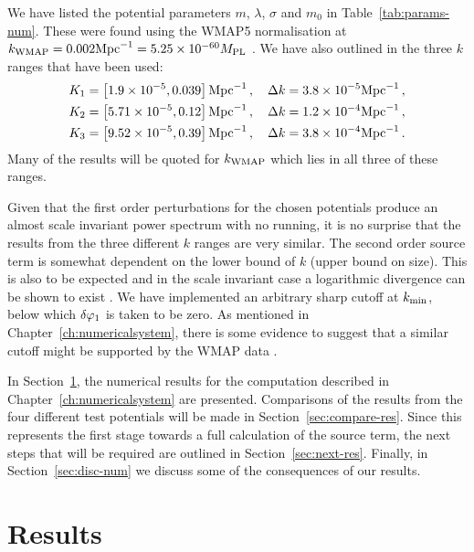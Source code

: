 We have listed the potential parameters $m$, $\lambda$, $\sigma$ and $m_0$
in Table~\ref{tab:params-num}. These were found using the WMAP5 normalisation
at $k_\mathrm{WMAP}=0.002 \mathrm{Mpc}^{-1} = 5.25 \times 10^{-60}M_{\mathrm{PL}}$ \cite{Komatsu:2008hk}.
We have also outlined in  the three $k$ ranges that have been
used:
% 
\begin{align}
\label{eq:Kranges-res}
K_1 &= \left[1.9\times 10^{-5}, 0.039\right]\mathrm{Mpc}^{-1}\,,\quad \Delta k =
3.8\times 10^{-5}\mathrm{Mpc}^{-1} \,,\nonumber\\
K_2 &= \left[5.71\times 10^{-5}, 0.12\right]\mathrm{Mpc}^{-1}\,, \quad \Delta k =
1.2\times 10^{-4}\mathrm{Mpc}^{-1} \,,
\nonumber\\ 
K_3 &= \left[9.52\times 10^{-5}, 0.39\right]\mathrm{Mpc}^{-1}\,, \quad \Delta k =
3.8\times 10^{-4}\mathrm{Mpc}^{-1} \,.
\end{align}
Many of the results will be quoted for $k_\mathrm{WMAP}$ which lies in all three of these
ranges.

Given that the first order perturbations for the chosen potentials produce an
almost scale invariant power spectrum with no running, it is no surprise that
the results from the three different $k$ ranges are very similar. The second
order source term is somewhat dependent on the lower bound of $k$ (upper bound
on size). This is also to be expected and in the scale invariant case a logarithmic
divergence can
be shown to exist \cite{Lyth:2007jh}. We have implemented an arbitrary sharp
cutoff at $k_{\mathrm{min}}$, below which 
$\delta\varphi_{1}$ is taken to be zero. 
As mentioned in Chapter~\ref{ch:numericalsystem}, there is some evidence to suggest
that a similar cutoff might be supported by the WMAP data
\cite{Sinha:2005mn,Kim:2009pf}. 

In Section~\ref{sec:results}, the numerical results for the computation described in
Chapter~\ref{ch:numericalsystem} are presented. Comparisons of the results from the
four different test potentials will be made in Section~\ref{sec:compare-res}. Since
this represents the first stage towards a full calculation of the source term, the
next
steps that will be required are outlined in Section~\ref{sec:next-res}. Finally,
in Section~\ref{sec:disc-num} we discuss some of the consequences of our results.
% 

\section{Results}
\label{sec:results}
